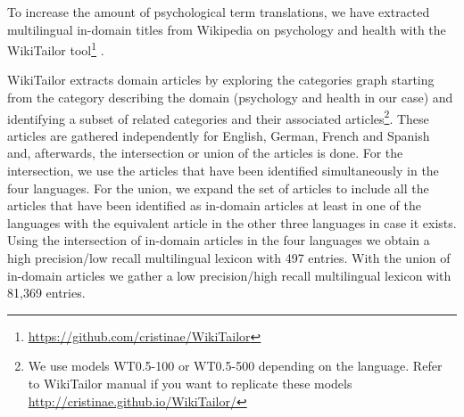 \documentclass[a4paper,11pt]{article}
\begin{document}
	

		
	To increase the amount of psychological term translations, we have extracted multilingual in-domain titles from Wikipedia on psychology and health with the WikiTailor tool\footnote{\url{https://github.com/cristinae/WikiTailor}} \cite{barronEtAl:2015}. 
	
	WikiTailor extracts domain articles by exploring the categories graph starting from the category describing the domain (psychology and health in our case) and identifying a subset of related categories and their associated articles\footnote{We use models WT0.5-100 or WT0.5-500 depending on the language. Refer to WikiTailor manual if you want to replicate these models \url{http://cristinae.github.io/WikiTailor/}}. These articles are gathered independently for English, German, French and Spanish and, afterwards, the intersection or union of the articles is done. For the intersection, we use the articles that have been identified simultaneously in the four languages. For the union, we expand the set of articles to include all the articles that have been identified as in-domain articles at least in one of the languages with the equivalent article in the other three languages in case it exists.	
	Using the intersection of in-domain articles in the four languages we obtain a high precision/low recall multilingual lexicon with 497 entries. With the union of in-domain articles we gather a low precision/high recall multilingual lexicon with 81,369 entries. 
	
\end{document}
